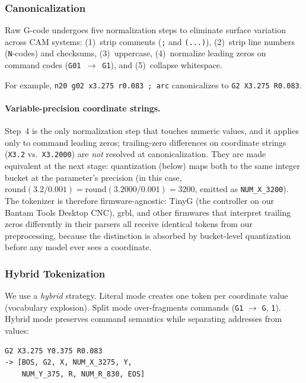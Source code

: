 \documentclass[11pt]{article}
\begin{document}
\subsubsection{Canonicalization}

Raw G-code undergoes five normalization steps to eliminate surface variation across CAM systems: (1)~strip comments (\texttt{;} and \texttt{(...)}), (2)~strip line numbers (\texttt{N}-codes) and checksums, (3)~uppercase, (4)~normalize leading zeros on command codes (\texttt{G01}~$\to$~\texttt{G1}), and (5)~collapse whitespace.

\noindent For example, \texttt{n20 g02 x3.275 r0.083 ; arc} canonicalizes to \texttt{G2 X3.275 R0.083}.

\paragraph{Variable-precision coordinate strings.}
Step~4 is the only normalization step that touches numeric values, and it applies only to command leading zeros; trailing-zero differences on coordinate strings (\texttt{X3.2} vs.\ \texttt{X3.2000}) are \emph{not} resolved at canonicalization. They are made equivalent at the next stage: quantization (below) maps both to the same integer bucket at the parameter's precision (in this case, $\text{round}(3.2 / 0.001) = \text{round}(3.2000 / 0.001) = 3200$, emitted as \texttt{NUM\_X\_3200}). The tokenizer is therefore firmware-agnostic: TinyG (the controller on our Bantam Tools Desktop CNC), grbl, and other firmwares that interpret trailing zeros differently in their parsers all receive identical tokens from our preprocessing, because the distinction is absorbed by bucket-level quantization before any model ever sees a coordinate.

\subsubsection{Hybrid Tokenization}

We use a \emph{hybrid} strategy. Literal mode creates one token per coordinate value (vocabulary explosion). Split mode over-fragments commands (\texttt{G1} $\to$ \texttt{G}, \texttt{1}). Hybrid mode preserves command semantics while separating addresses from values:

\begin{lstlisting}
G2 X3.275 Y0.375 R0.083
-> [BOS, G2, X, NUM_X_3275, Y,
    NUM_Y_375, R, NUM_R_830, EOS]
\end{lstlisting}
\end{document}
